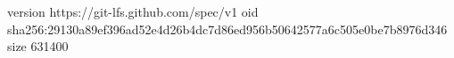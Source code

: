 version https://git-lfs.github.com/spec/v1
oid sha256:29130a89ef396ad52e4d26b4dc7d86ed956b50642577a6c505e0be7b8976d346
size 631400
